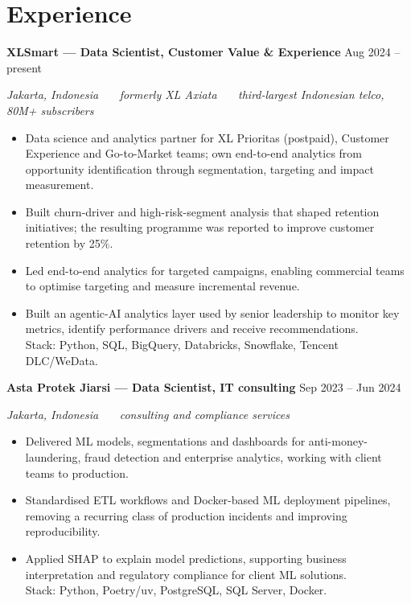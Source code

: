 \documentclass[11pt,a4paper]{article}
\newcommand{\heading}[2]{\textbf{#1} \hfill {\small\color{muted}#2}\par}
\newcommand{\subheading}[1]{\textit{\small #1}\par}
\begin{document}
\section{Experience}

\heading{XLSmart --- Data Scientist, Customer Value \& Experience}{Aug 2024 -- present}
\subheading{Jakarta, Indonesia \ \textbullet\ \ formerly XL Axiata \ \textbullet\ \ third-largest Indonesian telco, 80M+ subscribers}

\begin{itemize}
  \item Data science and analytics partner for XL Prioritas (postpaid), Customer Experience
        and Go-to-Market teams; own end-to-end analytics from opportunity identification
        through segmentation, targeting and impact measurement.
  \item Built churn-driver and high-risk-segment analysis that shaped retention initiatives;
        the resulting programme was reported to improve customer retention by 25\%.
  \item Led end-to-end analytics for targeted campaigns, enabling commercial teams to
        optimise targeting and measure incremental revenue.
  \item Built an agentic-AI analytics layer used by senior leadership to monitor key metrics,
        identify performance drivers and receive recommendations.\\
        Stack: Python, SQL, BigQuery, Databricks, Snowflake, Tencent DLC/WeData.
\end{itemize}

\heading{Asta Protek Jiarsi --- Data Scientist, IT consulting}{Sep 2023 -- Jun 2024}
\subheading{Jakarta, Indonesia \ \textbullet\ \ consulting and compliance services}

\begin{itemize}
  \item Delivered ML models, segmentations and dashboards for anti-money-laundering, fraud
        detection and enterprise analytics, working with client teams to production.
  \item Standardised ETL workflows and Docker-based ML deployment pipelines, removing a
        recurring class of production incidents and improving reproducibility.
  \item Applied SHAP to explain model predictions, supporting business interpretation and
        regulatory compliance for client ML solutions.\\
        Stack: Python, Poetry/uv, PostgreSQL, SQL Server, Docker.
\end{itemize}
\end{document}
